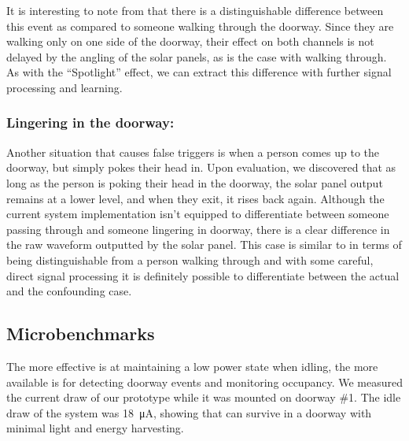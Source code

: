 It is interesting to note from  that there is a distinguishable difference between this event as compared to someone walking through the doorway.
Since they are walking only on one side of the doorway, their effect on both channels is not delayed by the angling of the solar panels, as is the case with walking through.
As with the ``Spotlight'' effect, we can extract this difference with further signal processing and learning.

\subsubsection{Lingering in the doorway:}
Another situation that causes false triggers is when a person comes up to the doorway, but simply pokes their head in.
Upon evaluation, we discovered that as long as the person is poking their head in the doorway, the solar panel output remains at a lower level, and when they exit, it rises back again.
Although the current system implementation isn't equipped to differentiate between someone passing through and someone lingering in doorway, there is a clear difference in the raw waveform outputted by the solar panel.
This case is similar to  in terms of being distinguishable from a person walking through and with some careful, direct signal processing it is definitely possible to differentiate between the actual and the confounding case.

\subsection{Microbenchmarks}
The more effective \sysname is at maintaining a low power state when idling, the more available \sysname is for detecting doorway events and monitoring occupancy.
We measured the current draw of our \sysname prototype while it was mounted on doorway \#1.
The idle draw of the system was \SI{18}{\micro\ampere}, showing that \sysname can survive in a doorway with minimal light and energy harvesting.






